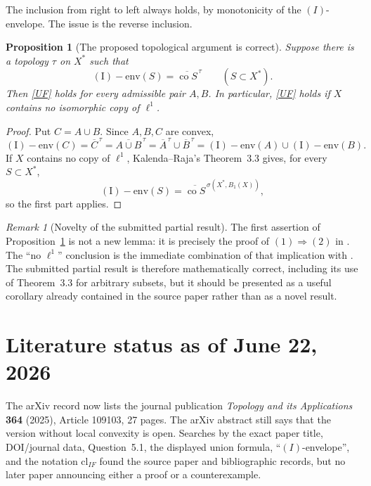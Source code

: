 \documentclass[11pt]{article}
\newtheorem{proposition}[theorem]{Proposition}
\theoremstyle{remark}
\newtheorem{remark}[theorem]{Remark}
\newcommand{\Ienv}{\operatorname{(I)\!\!-env}}
\newcommand{\co}{\operatorname{co}}
\begin{document}
The inclusion from right to left always holds, by monotonicity of the
$(I)$-envelope.  The issue is the reverse inclusion.

\begin{proposition}[The proposed topological argument is correct]
\label{prop:topological}
Suppose there is a topology $\tau$ on $X^*$ such that
\[
 \Ienv(S)=\overline{\co S}^{\,\tau}
 \qquad(S\subset X^*).
\]
Then \eqref{UF} holds for every admissible pair $A,B$.  In particular,
\eqref{UF} holds if $X$ contains no isomorphic copy of $\ell^1$.
\end{proposition}

\begin{proof}
Put $C=A\cup B$.  Since $A,B,C$ are convex,
\[
\Ienv(C)=\overline C^{\,\tau}
=\overline{A\cup B}^{\,\tau}
=\overline A^{\,\tau}\cup\overline B^{\,\tau}
=\Ienv(A)\cup\Ienv(B).
\]
If $X$ contains no copy of $\ell^1$, Kalenda--Raja's Theorem~3.3 gives,
for every $S\subset X^*$,
\[
 \Ienv(S)=\overline{\co S}^{\,\sigma(X^*,B_1(X))},
\]
so the first part applies.
\end{proof}

\begin{remark}[Novelty of the submitted partial result]
The first assertion of Proposition~\ref{prop:topological} is not a new
lemma: it is precisely the proof of $(1)\Rightarrow(2)$ in
\cite[Theorem~4.3]{KR}.  The ``no $\ell^1$'' conclusion is the immediate
combination of that implication with \cite[Theorem~3.3]{KR}.  The submitted
partial result is therefore mathematically correct, including its use of
Theorem~3.3 for arbitrary subsets, but it should be presented as a useful
corollary already contained in the source paper rather than as a novel
result.
\end{remark}

\section{Literature status as of June 22, 2026}

The arXiv record now lists the journal publication
\emph{Topology and its Applications} \textbf{364} (2025), Article 109103,
27 pages.  The arXiv abstract still says that the version without local
convexity is open.  Searches by the exact paper title, DOI/journal data,
Question~5.1, the displayed union formula, ``$(I)$-envelope'', and the
notation $\mathrm{cl}_{IF}$ found the source paper and bibliographic records,
but no later paper announcing either a proof or a counterexample.
\end{document}

